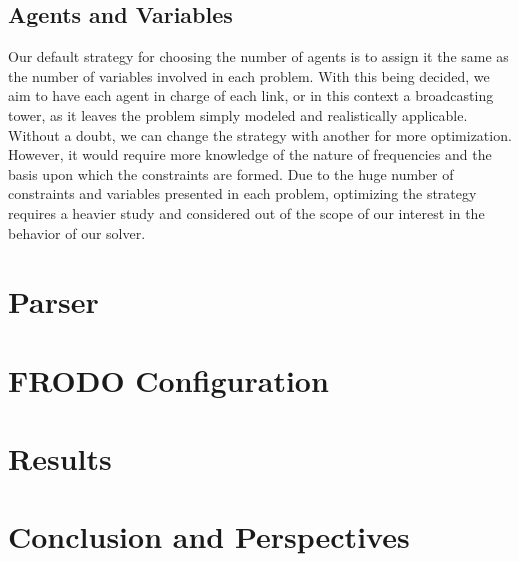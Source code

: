 \documentclass{article}
\begin{document}
	\subsection{Agents and Variables}
	Our default strategy for choosing the number of agents is to assign it the same as the number of variables involved in each problem. With this being decided, we aim to have each agent in charge of each link, or in this context a broadcasting tower, as it leaves the problem simply modeled and realistically applicable. Without a doubt, we can change the strategy with another for more optimization. However, it would require more knowledge of the nature of frequencies and the basis upon which the constraints are formed. Due to the huge number of constraints and variables presented in each problem, optimizing the strategy requires a heavier study and considered out of the scope of our interest in the behavior of our solver. 
	
	\section{Parser}
	\section{FRODO Configuration}
	\section{Results}
	\section{Conclusion and Perspectives}
	\newpage
	
	
\end{document}
